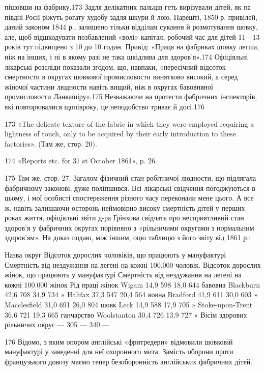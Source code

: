 пішовши на фабрику.173 Задля делікатних пальців геть вирізували
дітей, як на півдні Росії ріжуть рогату худобу задля шкури
й лою. Нарешті, 1850 р. привілей, даний законом 1844 р., залишено
тільки відділам сукання й розмотування шовку, але, щоб
відшкодувати позбавлений «волі» капітал, робочий час для дітей
11—13 років тут підвищено з 10 до 10 годин. Привід: «Праця
на фабриках шовку легша, ніж на інших, і ні в якому разі не така
шкідлива для здоров’я».174 Офіціяльні лікарські розсліди показали
згодом, що, навпаки, «пересічний відсоток смертности в
округах шовкової промисловости винятково високий, а серед жіночої
частини людности навіть вищий, ніж в округах бавовняної
промисловости Ланкашіру».175 Незважаючи на протести фабричних
інспекторів, які повторювалися щопівроку, це неподобство
триває й досі.176

173 «The delicate texture of the fabric in which they were employed
requiring a lightness of touch, only to be acquired by their early introduction
to these factories». (Там же, стор. 20).

174 «Reports etc. for 31 st October 1861», p. 26.

175 Там же, стор. 27. Загалом фізичний стан робітничої людности,
що підлягала фабричному законові, дуже поліпшився. Всі лікарські
свідчення погоджуються в цьому, і мої особисті спостереження різного
часу переконали мене цього. А все ж, навіть залишаючи осторонь неймовірно
високу смертність дітей у перших роках життя, офіціяльні
звіти д-ра Ґрінхова свідчать про несприятливий стан здоров’я у фабричних
округах порівняно з «рільничими округами з нормальним здоров'ям».
На доказ подаю, між іншим, оцю таблицю з його звіту від 1861 р.:

Назва округ    Відсоток дорослих чоловіків, що працюють у мануфактурі    Смертність від нездужання
на легені на кожні 100.000 чоловік. Відсоток дорослих жінок, що працюють у мануфактурі    Смертність
від нездужання на легені на кожні 100.000 жінок    Рід праці жінок
Wigam                        14,9     598    18,0     644    бавовна
Blackburn                   42,6     708    34,9     734          »
Halifax                        37,3      547    20,4     564     вовна
Bradford                      41,9     611   30,0    603         »
Macclesfield               31,0     691    26,0     804      шовк
Leck                             14,9     588    17,9     705           »
Stoke-upon-Trent     36,6    721    19,3     665    ганчарство
Woolstanton              30,4    726    13,9      727           »
Вісім здорових
рільничих округ       —       305   —        340            —

176 Відомо, з яким опором англійські «фритредери» відмовили шовковій
мануфактурі у заведенні для неї охоронного мита. Замість оборони
проти французького довозу маємо тепер безоборонність англійських фабричних
дітей.
